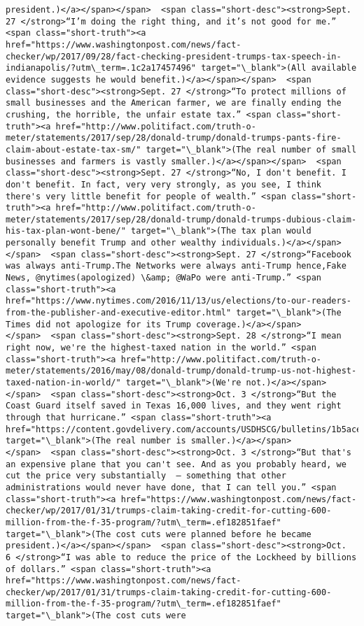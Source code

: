 \documentclass[11pt]{article}
\begin{document}
\begin{Verbatim}[commandchars=\\\{\}]
president.)</a></span></span>  <span class="short-desc"><strong>Sept. 27 </strong>“I’m doing the right thing, and it’s not good for me.” <span class="short-truth"><a href="https://www.washingtonpost.com/news/fact-checker/wp/2017/09/28/fact-checking-president-trumps-tax-speech-in-indianapolis/?utm\_term=.1c2a17457496" target="\_blank">(All available evidence suggests he would benefit.)</a></span></span>  <span class="short-desc"><strong>Sept. 27 </strong>“To protect millions of small businesses and the American farmer, we are finally ending the crushing, the horrible, the unfair estate tax.” <span class="short-truth"><a href="http://www.politifact.com/truth-o-meter/statements/2017/sep/28/donald-trump/donald-trumps-pants-fire-claim-about-estate-tax-sm/" target="\_blank">(The real number of small businesses and farmers is vastly smaller.)</a></span></span>  <span class="short-desc"><strong>Sept. 27 </strong>“No, I don't benefit. I don't benefit. In fact, very very strongly, as you see, I think there's very little benefit for people of wealth.” <span class="short-truth"><a href="http://www.politifact.com/truth-o-meter/statements/2017/sep/28/donald-trump/donald-trumps-dubious-claim-his-tax-plan-wont-bene/" target="\_blank">(The tax plan would personally benefit Trump and other wealthy individuals.)</a></span></span>  <span class="short-desc"><strong>Sept. 27 </strong>“Facebook was always anti-Trump.The Networks were always anti-Trump hence,Fake News, @nytimes(apologized) \&amp; @WaPo were anti-Trump.” <span class="short-truth"><a href="https://www.nytimes.com/2016/11/13/us/elections/to-our-readers-from-the-publisher-and-executive-editor.html" target="\_blank">(The Times did not apologize for its Trump coverage.)</a></span></span>  <span class="short-desc"><strong>Sept. 28 </strong>“I mean right now, we're the highest-taxed nation in the world.” <span class="short-truth"><a href="http://www.politifact.com/truth-o-meter/statements/2016/may/08/donald-trump/donald-trump-us-not-highest-taxed-nation-in-world/" target="\_blank">(We're not.)</a></span></span>  <span class="short-desc"><strong>Oct. 3 </strong>“But the Coast Guard itself saved in Texas 16,000 lives, and they went right through that hurricane.” <span class="short-truth"><a href="https://content.govdelivery.com/accounts/USDHSCG/bulletins/1b5ace3" target="\_blank">(The real number is smaller.)</a></span></span>  <span class="short-desc"><strong>Oct. 3 </strong>“But that's an expensive plane that you can't see. And as you probably heard, we cut the price very substantially  – something that other administrations would never have done, that I can tell you.” <span class="short-truth"><a href="https://www.washingtonpost.com/news/fact-checker/wp/2017/01/31/trumps-claim-taking-credit-for-cutting-600-million-from-the-f-35-program/?utm\_term=.ef182851faef" target="\_blank">(The cost cuts were planned before he became president.)</a></span></span>  <span class="short-desc"><strong>Oct. 6 </strong>“I was able to reduce the price of the Lockheed by billions of dollars.” <span class="short-truth"><a href="https://www.washingtonpost.com/news/fact-checker/wp/2017/01/31/trumps-claim-taking-credit-for-cutting-600-million-from-the-f-35-program/?utm\_term=.ef182851faef" target="\_blank">(The cost cuts were 
\end{Verbatim}
\end{document}
